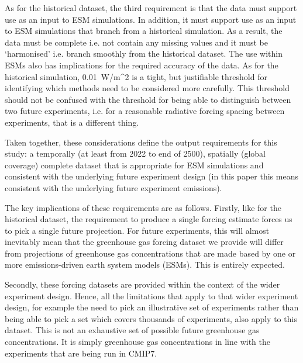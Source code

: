 As for the historical dataset, the third requirement is that the data must support use as an input to ESM simulations.
In addition, it must support use as an input to ESM simulations that branch from a historical simulation.
As a result, the data must be complete i.e. not contain any missing values
and it must be `harmonised' i.e. branch smoothly from the historical dataset.
The use within ESMs also has implications for the required accuracy of the data.
As for the historical simulation, 0.01~W/m^2 is a tight, but justifiable threshold for identifying which methods need to be considered more carefully.
This threshold should not be confused with the threshold for being able to distinguish between two future experiments,
i.e. for a reasonable radiative forcing spacing between experiments, that is a different thing.

Taken together, these considerations define the output requirements for this study:
a temporally (at least from 2022 to end of 2500),
spatially (global coverage) complete dataset
that is appropriate for ESM simulations
and consistent with the underlying future experiment design
(in this paper this means consistent with the underlying future experiment emissions).

The key implications of these requirements are as follows.
Firstly, like for the historical dataset, the requirement to produce a single forcing estimate forces us to pick a single future projection.
For future experiments, this will almost inevitably mean that the greenhouse gas forcing dataset we provide
will differ from projections of greenhouse gas concentrations that are made based by one or more emissions-driven earth system models (ESMs).
This is entirely expected.

Secondly, these forcing datasets are provided within the context of the wider experiment design.
Hence, all the limitations that apply to that wider experiment design,
for example the need to pick an illustrative set of experiments
rather than being able to pick a set which covers thousands of experiments,
also apply to this dataset.
This is not an exhaustive set of possible future greenhouse gas concentrations.
It is simply greenhouse gas concentrations in line with the experiments that are being run in CMIP7.

